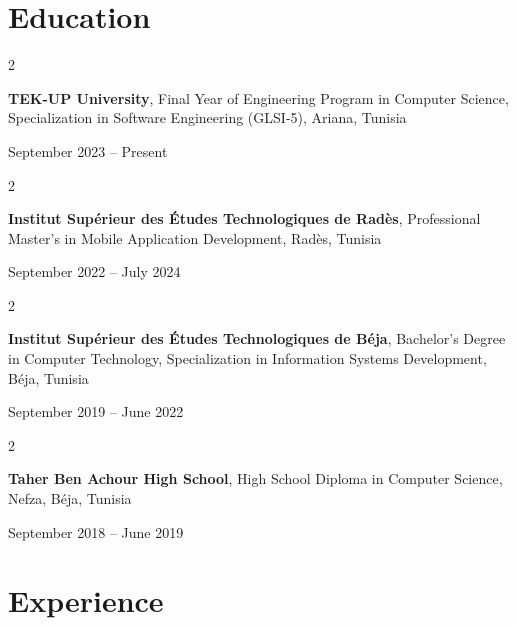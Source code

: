 \documentclass[10pt, letterpaper]{article}
\newenvironment{twocolentry}[2][]{
    \onecolentry
    \def\secondColumn{#2}
    \setcolumnwidth{\fill, 4.5 cm}
    \begin{paracol}{2}
}{
    \switchcolumn \raggedleft \secondColumn
    \end{paracol}
    \endonecolentry
} %
\begin{document}



        \section{Education}
        
        \begin{twocolentry}{
            September 2023 – Present
        }
            \textbf{TEK-UP University}, Final Year of Engineering Program in Computer Science, Specialization in Software Engineering (GLSI-5), Ariana, Tunisia
        \end{twocolentry}
        
        \vspace{0.10 cm}
        \begin{twocolentry}{
            September 2022 – July 2024
        }
            \textbf{Institut Supérieur des Études Technologiques de Radès}, Professional Master's in Mobile Application Development, Radès, Tunisia
        \end{twocolentry}
        
        \vspace{0.10 cm}
        \begin{twocolentry}{
            September 2019 – June 2022
        }
            \textbf{Institut Supérieur des Études Technologiques de Béja}, Bachelor's Degree in Computer Technology, Specialization in Information Systems Development, Béja, Tunisia
        \end{twocolentry}
        
        \vspace{0.10 cm}
        \begin{twocolentry}{
            September 2018 – June 2019
        }
            \textbf{Taher Ben Achour High School}, High School Diploma in Computer Science, Nefza, Béja, Tunisia
        \end{twocolentry}
        
             
       
        
        \section{Experience}
        
\end{document}
